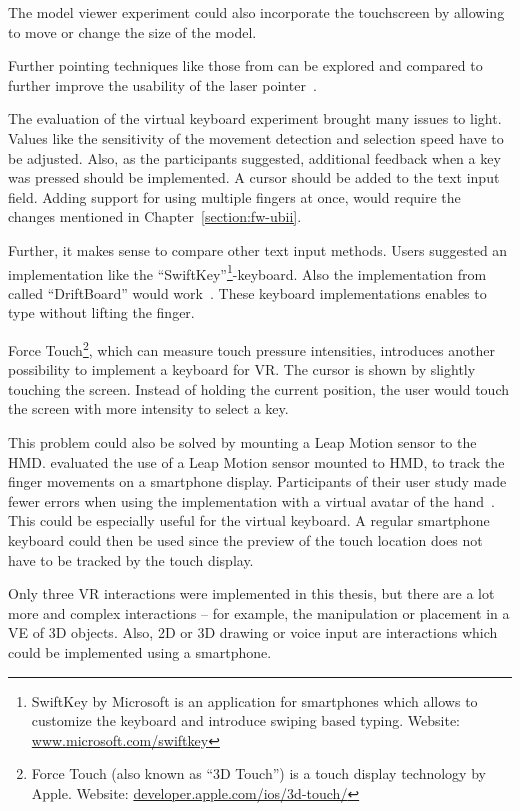 The model viewer experiment could also incorporate the touchscreen by allowing to move or change the size of the model.

Further pointing techniques like those from \citeauthor{Argelaguet.2013} can be explored and compared to further improve the usability of the laser pointer~\cite[123]{Argelaguet.2013}.

The evaluation of the virtual keyboard experiment brought many issues to light. 
Values like the sensitivity of the movement detection and selection speed have to be adjusted. Also, as the participants suggested, additional feedback when a key was pressed should be implemented. A cursor should be added to the text input field. Adding support for using multiple fingers at once, would require the changes mentioned in Chapter~\ref{section:fw-ubii}.

Further, it makes sense to compare other text input methods. Users suggested an implementation like the \enquote{SwiftKey}\footnote{SwiftKey by Microsoft is an application for smartphones which allows to customize the keyboard and introduce swiping based typing. Website: \href{https://www.microsoft.com/swiftkey}{www.microsoft.com/swiftkey}}-keyboard. Also the implementation from \citeauthor{Shibata.2016} called \enquote{DriftBoard} would work~\cite{Shibata.2016}. These keyboard implementations enables to type without lifting the finger. 

Force Touch\footnote{Force Touch (also known as \enquote{3D Touch}) is a touch display technology by Apple. Website: \href{https://developer.apple.com/ios/3d-touch/}{developer.apple.com/ios/3d-touch/}}, which can measure touch pressure intensities, introduces another possibility to implement a keyboard for \ac{VR}. The cursor is shown by slightly touching the screen. Instead of holding the current position, the user would touch the screen with more intensity to select a key. 

This problem could also be solved by mounting a Leap Motion sensor to the \ac{HMD}. \citeauthor{Afonso.2017} evaluated the use of a Leap Motion sensor mounted to \ac{HMD}, to track the finger movements on a smartphone display. Participants of their user study made fewer errors when using the implementation with a virtual avatar of the hand~\cite[247\psq]{Afonso.2017}. This could be especially useful for the virtual keyboard. A regular smartphone keyboard could then be used since the preview of the touch location does not have to be tracked by the touch display.

Only three \ac{VR} interactions were implemented in this thesis, but there are a lot more and complex interactions -- for example, the manipulation or placement in a \ac{VE} of \ac{3D} objects. Also, \ac{2D} or \ac{3D} drawing or voice input are interactions which could be implemented using a smartphone. %

